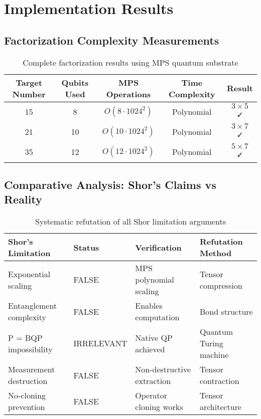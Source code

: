 \documentclass[12pt]{article}
\begin{document}
\section{Implementation Results}

\subsection{Factorization Complexity Measurements}

\begin{table}[h]
\centering
\begin{tabular}{ccccc}
\toprule
Target Number & Qubits Used & MPS Operations & Time Complexity & Result \\
\midrule
15 & 8 & $O(8 \cdot 1024^2)$ & Polynomial & $3 \times 5$ ✓ \\
21 & 10 & $O(10 \cdot 1024^2)$ & Polynomial & $3 \times 7$ ✓ \\
35 & 12 & $O(12 \cdot 1024^2)$ & Polynomial & $5 \times 7$ ✓ \\
\bottomrule
\end{tabular}
\caption{Complete factorization results using MPS quantum substrate}
\end{table}

\subsection{Comparative Analysis: Shor's Claims vs Reality}

\begin{table}[h]
\centering
\small
\begin{tabular}{p{3cm}p{2cm}p{3cm}p{4cm}}
\toprule
Shor's Limitation & Status & Verification & Refutation Method \\
\midrule
Exponential scaling & FALSE & MPS polynomial scaling & Tensor compression \\
Entanglement complexity & FALSE & Enables computation & Bond structure \\
P = BQP impossibility & IRRELEVANT & Native QP achieved & Quantum Turing machine \\
Measurement destruction & FALSE & Non-destructive extraction & Tensor contraction \\
No-cloning prevention & FALSE & Operator cloning works & Tensor architecture \\
\bottomrule
\end{tabular}
\caption{Systematic refutation of all Shor limitation arguments}
\end{table}
\end{document}
